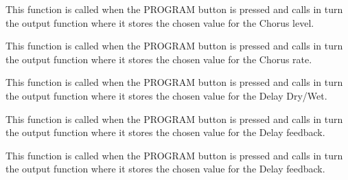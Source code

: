 \documentclass[letterpaper,10pt,english]{sphinxmanual}
\begin{document}

\begin{fulllineitems}
\label{Code:GUI.set_chorusLevel}
This function is called when the PROGRAM button is pressed and calls in turn the output function where it stores the chosen 
value for the Chorus level.

\end{fulllineitems}


\begin{fulllineitems}
\label{Code:GUI.set_chorusRate}
This function is called when the PROGRAM button is pressed and calls in turn the output function where it stores the chosen 
value for the Chorus rate.

\end{fulllineitems}


\begin{fulllineitems}
\label{Code:GUI.set_delayDryWet}
This function is called when the PROGRAM button is pressed and calls in turn the output function where it stores the chosen 
value for the Delay Dry/Wet.

\end{fulllineitems}


\begin{fulllineitems}
\label{Code:GUI.set_delayFeedback}
This function is called when the PROGRAM button is pressed and calls in turn the output function where it stores the chosen 
value for the Delay feedback.

\end{fulllineitems}


\begin{fulllineitems}
\label{Code:GUI.set_delayTime}
This function is called when the PROGRAM button is pressed and calls in turn the output function where it stores the chosen 
value for the Delay feedback.

\end{fulllineitems}
\end{document}

